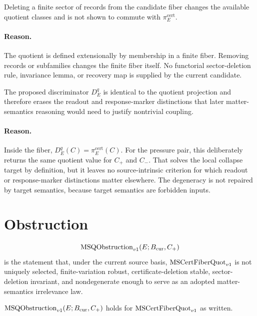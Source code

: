 \begin{proposition}
Deleting a finite sector of records from the candidate fiber changes the
available quotient classes and is not shown to commute with
\(\pi^{\mathrm{cert}}_E\).
\end{proposition}

\paragraph{Reason.}
The quotient is defined extensionally by membership in a finite fiber. Removing
records or subfamilies changes the finite fiber itself. No functorial
sector-deletion rule, invariance lemma, or recovery map is supplied by the
current candidate.

\begin{proposition}
The proposed discriminator \(D^q_E\) is identical to the quotient projection
and therefore erases the readout and response-marker distinctions that later
matter-semantics reasoning would need to justify nontrivial coupling.
\end{proposition}

\paragraph{Reason.}
Inside the fiber, \(D^q_E(C)=\pi^{\mathrm{cert}}_E(C)\). For the pressure
pair, this deliberately returns the same quotient value for \(C_+\) and
\(C_-\). That solves the local collapse target by definition, but it leaves no
source-intrinsic criterion for which readout or response-marker distinctions
matter elsewhere. The degeneracy is not repaired by target semantics, because
target semantics are forbidden inputs.

\section{Obstruction}

\begin{definition}
\[
  \mathrm{MSQObstruction}_{v1}(E;B_{\mathrm{cur}},C_+)
\]
is the statement that, under the current source basis, \(\mathrm{MSCertFiberQuot}_{v1}\) is not
uniquely selected, finite-variation robust, certificate-deletion stable,
sector-deletion invariant, and nondegenerate enough to serve as an adopted
matter-semantics irrelevance law.
\end{definition}

\begin{proposition}
\(\mathrm{MSQObstruction}_{v1}(E;B_{\mathrm{cur}},C_+)\) holds for \(\mathrm{MSCertFiberQuot}_{v1}\) as written.
\end{proposition}

